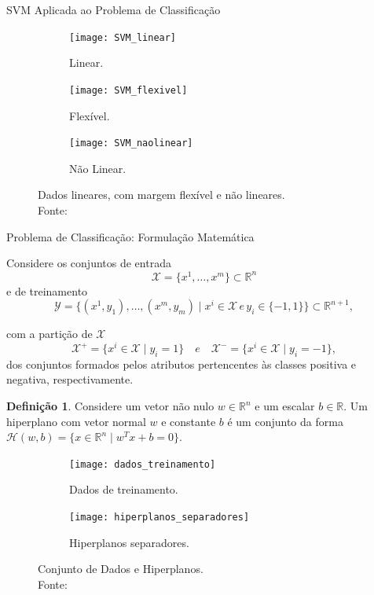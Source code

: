 \documentclass{beamer}
\def\Xset{\mathcal{X}}
\def\Yset{\mathcal{Y}}
\def\Hset{\mathcal{H}}
\def\RR{\mathds{R}}
\theoremstyle{definition}%
\newtheorem{defi}{Definição}
\begin{document}
\begin{frame}{SVM Aplicada ao Problema de Classificação}

\begin{figure}[!h] 
	\centering
	\begin{subfigure}[h]{0.3\textwidth}
		\centering
		\texttt{[image: SVM\_linear]}
		\caption{Linear. \label{fig1:a}}
	\end{subfigure}
	\begin{subfigure}[!h]{0.3\textwidth}
		\centering
		\texttt{[image: SVM\_flexivel]}
		\caption{Flexível. \label{fig1:b}}
	\end{subfigure}
	\begin{subfigure}[!h]{0.3\textwidth}
		\centering
		\texttt{[image: SVM\_naolinear]}
		\caption{Não Linear. \label{fig1:c}}
	\end{subfigure}
	\caption{Dados lineares, com margem flexível e não lineares. \label{fig1}\\ Fonte: \textcite{Evelin2017}}
\end{figure}
\end{frame}


\begin{frame}{Problema de Classificação: Formulação Matemática}
\begin{block}{}
Considere os conjuntos de entrada 
\[\Xset =\{x^1, \ldots , x^m \} \subset \RR^n \] 
e de treinamento 
\[\Yset=\{(x^1, y_1), \ldots , (x^m, y_m)\mid x^i \in \Xset \, e \, y_i \in \{-1,1\}\}  \subset \RR^{n+1},\]

com a partição de $\Xset$
\[ \label{conj1}
\Xset ^{+} =\{x^i \in \Xset\mid y_i=1\} \quad e \quad \Xset^{-}=\{x^i \in \Xset\mid y_i=-1\},
\]
dos conjuntos formados pelos atributos pertencentes às classes positiva e negativa, respectivamente.
\end{block}
\end{frame}


\begin{frame}

\begin{defi} 
Considere um vetor não nulo $w\in \RR^n$ e um escalar $b\in \RR$. Um hiperplano com vetor normal $w$ e constante $b$ é um conjunto da forma $\Hset(w,b)=\{x\in \RR^n \mid w^{T}x+b=0\}$.
\end{defi}
\pause
\begin{figure}[h] 
	\centering
	\begin{subfigure}[h]{0.36\textwidth}
		\centering
		\texttt{[image: dados\_treinamento]}
		\caption{Dados de treinamento. \label{fig2:a}}
	\end{subfigure}
	\begin{subfigure}[h]{0.34\textwidth}
		\centering
		\texttt{[image: hiperplanos\_separadores]}
		\caption{Hiperplanos separadores. \label{fig2:b}}
	\end{subfigure}
	\caption{Conjunto de Dados e Hiperplanos. \label{fig2}
		\\ Fonte: \textcite{Evelin2017}}
\end{figure}
\end{frame}
\end{document}
